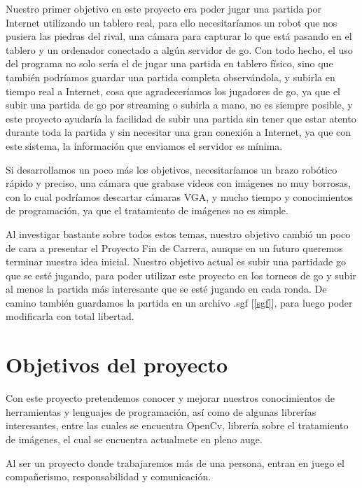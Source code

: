 \documentclass[12pt,a4paper]{report}
\begin{document}
Nuestro primer objetivo en este proyecto era poder jugar una partida por
Internet utilizando un tablero real, para ello necesitaríamos un robot que nos
pusiera las piedras del rival, una cámara para capturar lo que está pasando en
el tablero y un ordenador conectado a algún servidor de go. Con todo hecho, el
uso del programa no solo sería el de jugar una partida en tablero físico, sino
que también podríamos guardar una partida completa observándola, y subirla en
tiempo real a Internet, cosa que agradeceríamos los jugadores de go, ya que el
subir una partida de go por streaming o subirla a mano, no es siempre posible, y
este proyecto ayudaría la facilidad de subir una partida sin tener que estar
atento durante toda la partida y sin necesitar una gran conexión a Internet, ya
que con este sistema, la información que enviamos el servidor es mínima. 

Si desarrollamos un poco más los objetivos, necesitaríamos un brazo robótico
rápido y preciso, una cámara que grabase videos con imágenes no muy borrosas,
con lo cual podríamos descartar cámaras VGA, y mucho tiempo y conocimientos de
programación, ya que el tratamiento de imágenes no es simple. 

Al investigar bastante sobre todos estos temas, nuestro objetivo cambió un poco
de cara a presentar el Proyecto Fin de Carrera, aunque en un futuro queremos
terminar nuestra idea inicial. Nuestro objetivo actual es subir una partidade go
que se esté jugando, para poder utilizar este proyecto en los torneos de go y
subir al menos la partida más interesante que se esté jugando en cada ronda. De
camino también guardamos la partida en un archivo .sgf [\ref{sgf}], para luego
poder modificarla con total libertad. 


\section{Objetivos del proyecto} 

Con este proyecto pretendemos conocer y mejorar nuestros conocimientos de 
herramientas y lenguajes de programación, así como de algunas librerías
interesantes, entre las cuales se encuentra OpenCv, librería sobre el
tratamiento de imágenes, el cual se encuentra actualmete en pleno auge. 

Al ser un proyecto donde trabajaremos más de una persona, entran en juego el
compañerismo, responsabilidad y comunicación. 
\end{document}
